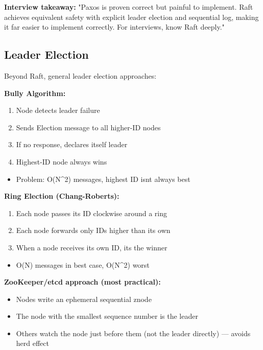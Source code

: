 \documentclass[11pt]{article}
\providecommand{\tightlist}{\setlength{\itemsep}{1pt}\setlength{\parskip}{0pt}}
\begin{document}
\textbf{Interview takeaway:} "Paxos is proven correct but painful to implement. Raft achieves equivalent safety with explicit leader election and sequential log, making it far easier to implement correctly. For interviews, know Raft deeply."

\subsection{Leader Election}\label{leader-election}

Beyond Raft, general leader election approaches:

\textbf{Bully Algorithm:}

\begin{enumerate}
\def\labelenumi{\arabic{enumi}.}
\tightlist
\item
  Node detects leader failure
\item
  Sends Election message to all higher-ID nodes
\item
  If no response, declares itself leader
\item
  Highest-ID node always wins
\end{enumerate}

\begin{itemize}
\tightlist
\item
  Problem: O(N\^{}2) messages, highest ID isn\textquotesingle t always best
\end{itemize}

\textbf{Ring Election (Chang-Roberts):}

\begin{enumerate}
\def\labelenumi{\arabic{enumi}.}
\tightlist
\item
  Each node passes its ID clockwise around a ring
\item
  Each node forwards only IDs higher than its own
\item
  When a node receives its own ID, it\textquotesingle s the winner
\end{enumerate}

\begin{itemize}
\tightlist
\item
  O(N) messages in best case, O(N\^{}2) worst
\end{itemize}

\textbf{ZooKeeper/etcd approach (most practical):}

\begin{itemize}
\tightlist
\item
  Nodes write an ephemeral sequential znode
\item
  The node with the smallest sequence number is the leader
\item
  Others watch the node just before them (not the leader directly) --- avoids herd effect
\end{itemize}
\end{document}
